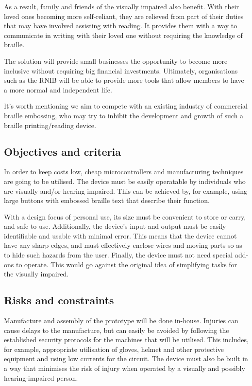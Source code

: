 As a result, family and friends of the visually impaired also benefit.
With their loved ones becoming more self-reliant, they are relieved from part of their duties that may have involved assisting with reading.
It provides them with a way to communicate in writing with their loved one without requiring the knowledge of braille.

The solution will provide small businesses the opportunity to become more inclusive without requiring big financial investments.
Ultimately, organisations such as the RNIB will be able to provide more tools that allow members to have a more normal and independent life.

It's worth mentioning we aim to compete with an existing industry of commercial braille embossing, who may try to inhibit the development and growth of such a braille printing/reading device.

\subsection{Objectives and criteria}
In order to keep costs low, cheap microcontrollers and manufacturing techniques are going to be utilised.
The device must be easily operatable by individuals who are visually and/or hearing impaired.
This can be achieved by, for example, using large buttons with embossed braille text that describe their function.

With a design focus of personal use, its size must be convenient to store or carry, and safe to use.
Additionally, the device's input and output must be easily identifiable and usable with minimal error.
This means that the device cannot have any sharp edges, and must effectively enclose wires and moving parts so as to hide such hazards from the user.
Finally, the device must not need special add-ons to operate.
This would go against the original idea of simplifying tasks for the visually impaired.
 

\subsection{Risks and constraints}
Manufacture and assembly of the prototype will be done in-house.
Injuries can cause delays to the manufacture, but can easily be avoided by following the established security protocols for the machines that will be utilised.
This includes, for example, appropriate utilisation of gloves, helmet and other protective equipment and using low currents for the circuit.
The device must also be built in a way that minimises the risk of injury when operated by a visually and possibly hearing-impaired person.


